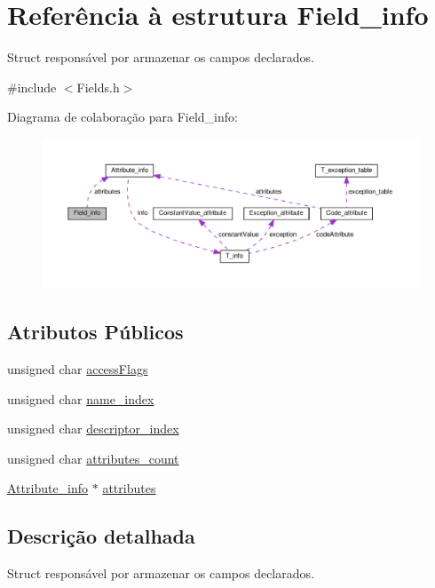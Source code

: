 \hypertarget{structField__info}{}\section{Referência à estrutura Field\+\_\+info}
\label{structField__info}


Struct responsável por armazenar os campos declarados.  




{\ttfamily \#include $<$Fields.\+h$>$}



Diagrama de colaboração para Field\+\_\+info\+:\nopagebreak
\begin{figure}[H]
\begin{center}
\leavevmode
\includegraphics[width=350pt]{structField__info__coll__graph}
\end{center}
\end{figure}
\subsection*{Atributos Públicos}
\begin{DoxyCompactItemize}
\item 
unsigned char \hyperlink{structField__info_a518c6efb3e5b805d738375e3411bc7b0}{access\+Flags}
\item 
unsigned char \hyperlink{structField__info_af4d468d17e45abb44e879e9c0f0b881d}{name\+\_\+index}
\item 
unsigned char \hyperlink{structField__info_a317d816b6661095bde8c391905385f10}{descriptor\+\_\+index}
\item 
unsigned char \hyperlink{structField__info_a293084dbdbd13fce49fd95edf118db31}{attributes\+\_\+count}
\item 
\hyperlink{structAttribute__info}{Attribute\+\_\+info} $\ast$ \hyperlink{structField__info_a82d5d1b1ba57dfc6b711072777d92894}{attributes}
\end{DoxyCompactItemize}


\subsection{Descrição detalhada}
Struct responsável por armazenar os campos declarados. 

